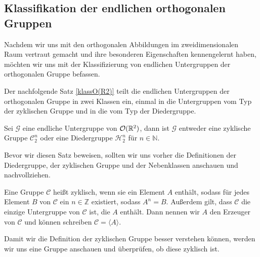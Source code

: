 \subsection{Klassifikation der endlichen orthogonalen Gruppen}
Nachdem wir uns mit den orthogonalen Abbildungen im zweidimensionalen Raum vertraut gemacht und ihre besonderen Eigenschaften kennengelernt haben, möchten wir uns mit der Klassifizierung von endlichen Untergruppen der orthogonalen Gruppe befassen.

Der nachfolgende Satz \ref{klassO(R2)} teilt die endlichen Untergruppen der orthogonalen Gruppe in zwei Klassen ein, einmal in die Untergruppen vom Typ der zyklischen Gruppe und in die vom Typ der Diedergruppe.
\begin{theorem}\label{klassO(R2)}
	Sei $\mathcal{G}$ eine endliche Untergruppe von ${\mathcal{O}(\mathbb{R}^2)}$, dann ist $\mathcal{G}$ entweder eine zyklische Gruppe $\mathcal{C}^n_2$ oder eine Diedergruppe $\mathcal{H}^n_2$ für $n \in \mathbb{N}$.
\end{theorem}
Bevor wir diesen Satz beweisen, sollten wir uns vorher die Definitionen der Diedergruppe, der zyklischen Gruppe und der Nebenklassen anschauen und nachvollziehen.
\begin{defi}
	Eine Gruppe $\mathcal{C}$ heißt zyklisch, wenn sie ein Element $A$ enthält, sodass für jedes Element $B$ von $\mathcal{C}$ ein $n \in \mathbb{Z}$ existiert, sodass $A^n = B$. Außerdem gilt, dass $\mathcal{C}$ die einzige Untergruppe von $\mathcal{C}$ ist, die $A$ enthält. Dann nennen wir $A$ den Erzeuger von $\mathcal{C}$ und können schreiben $\mathcal{C} = \langle A \rangle$.
\end{defi}
Damit wir die Definition der zyklischen Gruppe besser verstehen können, werden wir uns eine Gruppe anschauen und überprüfen, ob diese zyklisch ist.

